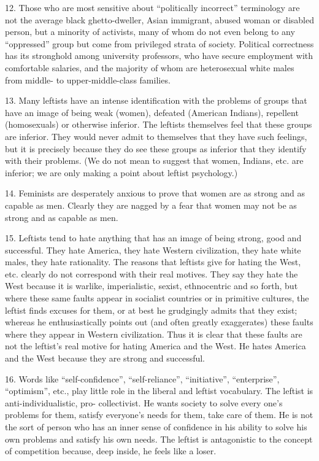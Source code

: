 \documentclass{article}
\begin{document}
12. Those who are most sensitive about “politically incorrect” terminology are not the average 
black ghetto-dweller, Asian immigrant, abused woman or disabled person, but a minority of 
activists, many of whom do not even belong to any “oppressed” group but come from privileged 
strata of society. Political correctness has its stronghold among university professors, who have 
secure employment with comfortable salaries, and the majority of whom are heterosexual white 
males from middle- to upper-middle-class families. \vspace{\baselineskip}

13. Many leftists have an intense identification with the problems of groups that have an image 
of being weak (women), defeated (American Indians), repellent (homosexuals) or otherwise 
inferior. The leftists themselves feel that these groups are inferior. They would never admit to 
themselves that they have such feelings, but it is precisely because they do see these groups as 
inferior that they identify with their problems. (We do not mean to suggest that women, Indians, 
etc. are inferior; we are only making a point about leftist psychology.) \vspace{\baselineskip}

14. Feminists are desperately anxious to prove that women are as strong and as capable as 
men. Clearly they are nagged by a fear that women may not be as strong and as capable as men. \vspace{\baselineskip}

15. Leftists tend to hate anything that has an image of being strong, good and successful. They 
hate America, they hate Western civilization, they hate white males, they hate rationality. The 
reasons that leftists give for hating the West, etc. clearly do not correspond with their real 
motives. They say they hate the West because it is warlike, imperialistic, sexist, ethnocentric and 
so forth, but where these same faults appear in socialist countries or in primitive cultures, the leftist 
finds excuses for them, or at best he grudgingly admits that they exist; whereas he enthusiastically 
points out (and often greatly exaggerates) these faults where they appear in Western 
civilization. Thus it is clear that these faults are not the leftist’s real motive for hating America 
and the West. He hates America and the West because they are strong and successful. \vspace{\baselineskip}

16. Words like “self-confidence”, “self-reliance”, “initiative”, “enterprise”, “optimism”, etc., play 
little role in the liberal and leftist vocabulary. The leftist is anti-individualistic, pro-
collectivist. He wants society to solve every one’s problems for them, satisfy everyone’s needs 
for them, take care of them. He is not the sort of person who has an inner sense of confidence in 
his ability to solve his own problems and satisfy his own needs. The leftist is antagonistic to the 
concept of competition because, deep inside, he feels like a loser. \vspace{\baselineskip}
\end{document}
